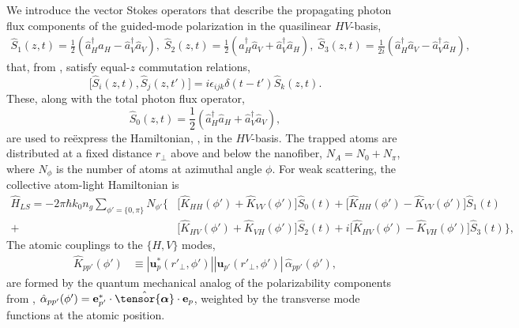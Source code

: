 \documentclass[preprint,aps,pra,onecolumn]{revtex4-1} %
\newcommand{\poltens}{\hat{\tensor{\boldsymbol{\alpha}}}}
\begin{document}
We introduce the vector Stokes operators that describe the propagating photon flux components of the guided-mode polarization in the quasilinear $HV$-basis,
	\begin{align} \label{Eq::StokesComponents}
		\hat{S}_1(z,t) = \frac{1}{2}\left(\hat{a}^\dag_H \hat{a}_H-\hat{a}^\dag_V \hat{a}_V \right), \; \hat{S}_2(z,t) = \frac{1}{2}\left(\hat{a}^\dag_H \hat{a}_V+\hat{a}^\dag_V \hat{a}_H \right), \; \hat{S}_3(z,t) = \frac{1}{2i}\left(\hat{a}^\dag_H \hat{a}_V-\hat{a}^\dag_V \hat{a}_H \right),
	\end{align}
that, from , satisfy equal-$z$ commutation relations,
	\begin{equation} \label{Eq::StokesCommutation}
		\big[\hat{S}_i(z,t), \hat{S}_j(z,t')\big] =i \epsilon_{ijk} \delta(t-t')  \hat{S}_k(z,t).
	\end{equation}
These, along with the total photon flux operator,
	\begin{equation}
		\hat{S}_0(z,t) = \frac{1}{2}\left(\hat{a}^\dag_H \hat{a}_H+\hat{a}^\dag_V \hat{a}_V \right),
	\end{equation}
are used to re\"{e}xpress the Hamiltonian, , in the $HV$-basis. The trapped atoms are distributed at a fixed distance $r_\perp$ above and below the nanofiber, $N_A = N_0 + N_\pi$, where $N_{\phi}$ is the number of atoms at azimuthal angle $\phi$. For weak scattering, the collective atom-light Hamiltonian is
	\begin{align}  
		\hat{H}_{LS}  %
	= - 2 \pi \hbar k_0 n_g \sum_{\phi' = \{ 0, \pi\} }N_{\phi'} \Big\{ &\big[ \hat{K}_{HH}(\phi')+\hat{K}_{VV}(\phi') \big] \hat{S}_0(t) +  \big[\hat{K}_{HH}(\phi') - \hat{K}_{VV}(\phi') \big] \hat{S}_1(t) \nonumber \\
+ &\big[\hat{K}_{HV}(\phi') + \hat{K}_{VH}(\phi') \big] \hat{S}_2(t) + i  \big[ \hat{K}_{HV}(\phi')-\hat{K}_{VH}(\phi') \big]\hat{S}_3(t) \Big\}, \label{Eq::GenHamiltonian} 
	\end{align}
The atomic couplings to the $\{H,V\}$ modes,
	\begin{align} 
		\hat{K}_{p p'}(\phi') & \equiv |\mathbf{u}^*_p(r'_{\perp},\phi')||\mathbf{u}_{p'}(r'_{\perp},\phi')| \, \hat{\alpha}_{p p'}(\phi'), 
	\end{align}
are formed by the quantum mechanical analog of the polarizability components from , $\hat{\alpha}_{p p'}(\phi') = \mathbf{e}^*_{p'}  \cdot \poltens \cdot \mathbf{e}_{p}$, weighted by the transverse mode functions at the atomic position.
\end{document}
